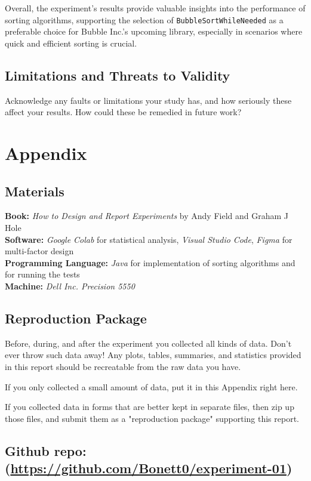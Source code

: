 \documentclass{article}
\begin{document}
\begin{tcolorbox}[title=Conclusion, colback=white, colframe=black, arc=0pt, outer arc=0pt]
    Overall, the experiment's results provide valuable insights into the performance of sorting algorithms, supporting the selection of \texttt{BubbleSortWhileNeeded} as a preferable choice for Bubble Inc.'s upcoming library, especially in scenarios where quick and efficient sorting is crucial.
\end{tcolorbox}


\subsection{Limitations and Threats to Validity}
Acknowledge any faults or limitations your study has, and how seriously these affect your
results. How could these be remedied in future work?

\section{Appendix}
\subsection{Materials}
\textbf{Book: } \textit{How to Design and Report Experiments} by Andy Field and Graham J Hole\\
\textbf{Software: } \textit{Google Colab} for statistical analysis, \textit{Visual Studio Code}, \textit{Figma} for multi-factor design\\
\textbf{Programming Language: } \textit{Java} for implementation of sorting algorithms and for running the tests\\
\textbf{Machine: } \textit {Dell Inc. Precision 5550 }
\subsection{Reproduction Package}
Before, during, and after the experiment you collected all kinds of data. Don't ever throw such data away! Any plots, tables, summaries, and statistics provided in this report should be recreatable from the raw data you have.

If you only collected a small amount of data, put it in this Appendix right here.

If you collected data in forms that are better kept in separate files, then zip up those files, and submit them as a "reproduction package" supporting this report.

\subsection*{{Github repo: (\url{https://github.com/Bonett0/experiment-01})}}
\end{document}
